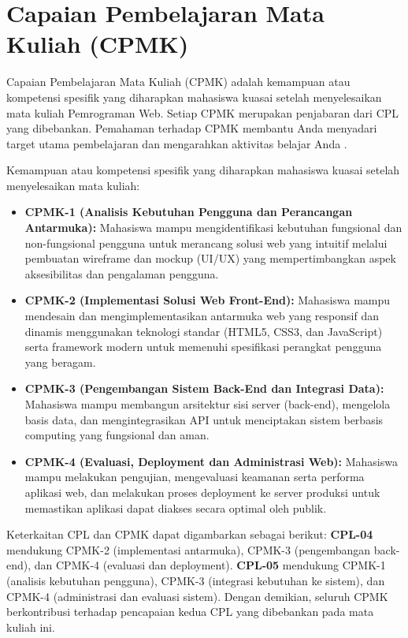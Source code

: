 \section{Capaian Pembelajaran Mata Kuliah (CPMK)}

Capaian Pembelajaran Mata Kuliah (CPMK) adalah kemampuan atau kompetensi spesifik yang diharapkan mahasiswa kuasai setelah menyelesaikan mata kuliah Pemrograman Web. Setiap CPMK merupakan penjabaran dari CPL yang dibebankan. Pemahaman terhadap CPMK membantu Anda menyadari target utama pembelajaran dan mengarahkan aktivitas belajar Anda \cite{aptikomObe}.

Kemampuan atau kompetensi spesifik yang diharapkan mahasiswa kuasai setelah menyelesaikan mata kuliah:

\begin{itemize}[leftmargin=*]
  \item \textbf{CPMK-1 (Analisis Kebutuhan Pengguna dan Perancangan Antarmuka):} Mahasiswa mampu mengidentifikasi kebutuhan fungsional dan non-fungsional pengguna untuk merancang solusi web yang intuitif melalui pembuatan wireframe dan mockup (UI/UX) yang mempertimbangkan aspek aksesibilitas dan pengalaman pengguna.
  \item \textbf{CPMK-2 (Implementasi Solusi Web Front-End):} Mahasiswa mampu mendesain dan mengimplementasikan antarmuka web yang responsif dan dinamis menggunakan teknologi standar (HTML5, CSS3, dan JavaScript) serta framework modern untuk memenuhi spesifikasi perangkat pengguna yang beragam.
  \item \textbf{CPMK-3 (Pengembangan Sistem Back-End dan Integrasi Data):} Mahasiswa mampu membangun arsitektur sisi server (back-end), mengelola basis data, dan mengintegrasikan API untuk menciptakan sistem berbasis computing yang fungsional dan aman.
  \item \textbf{CPMK-4 (Evaluasi, Deployment dan Administrasi Web):} Mahasiswa mampu melakukan pengujian, mengevaluasi keamanan serta performa aplikasi web, dan melakukan proses deployment ke server produksi untuk memastikan aplikasi dapat diakses secara optimal oleh publik.
\end{itemize}

Keterkaitan CPL dan CPMK dapat digambarkan sebagai berikut: \textbf{CPL-04} mendukung CPMK-2 (implementasi antarmuka), CPMK-3 (pengembangan back-end), dan CPMK-4 (evaluasi dan deployment). \textbf{CPL-05} mendukung CPMK-1 (analisis kebutuhan pengguna), CPMK-3 (integrasi kebutuhan ke sistem), dan CPMK-4 (administrasi dan evaluasi sistem). Dengan demikian, seluruh CPMK berkontribusi terhadap pencapaian kedua CPL yang dibebankan pada mata kuliah ini.
